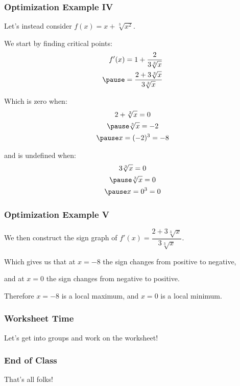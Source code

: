 \documentclass{ltx-talk}
\begin{document}
\begin{frame}
  \frametitle{Optimization Example IV}

  Let's instead consider $f(x) = x + \sqrt[3]{x^2}$. \pause

  We start by finding critical points:
  \begin{align}
    f'(x) &= 1 + \dfrac{2}{3\sqrt[3]{x}} \\ \pause
          &= \dfrac{2 + 3\sqrt[3]{x}}{3\sqrt[3]{x}}
  \end{align} \pause

  Which is zero when: \pause
  \begin{gather}
    2 + \sqrt[3]{x} = 0 \\ \pause
    \sqrt[3]{x} = -2 \\ \pause
    x = (-2)^3 = -8
  \end{gather} \pause

  and is undefined when: \pause
  \begin{gather}
    3\sqrt[3]{x} = 0 \\ \pause
    \sqrt[3]{x} = 0 \\ \pause
    x = 0^3 = 0
  \end{gather}
\end{frame}

\begin{frame}
  \frametitle{Optimization Example V}

  We then construct the sign graph of $f'(x) = \dfrac{2 + 3\sqrt[3]{x}}{3\sqrt[3]{x}}$. \pause


  Which gives us that at $x = -8$ the sign changes from \pause positive to \pause negative,

  and at $x = 0$ the sign changes from \pause negative to \pause positive. \pause

  Therefore $x = -8$ is a local \pause maximum, \pause
  and $x = 0$ is a local \pause minimum.
\end{frame}

\begin{frame}
  \frametitle{Worksheet Time}

  Let's get into groups and work on the worksheet!
\end{frame}

\begin{frame}
  \frametitle{End of Class}

  That's all folks!
\end{frame}
\end{document}
